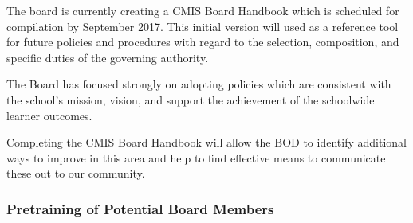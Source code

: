 \begin{findings}
The board is currently creating a CMIS Board Handbook which is scheduled for compilation by September 2017. This initial version will used as a reference tool for future policies and procedures with regard to the selection, composition, and specific duties of the governing authority. 


The Board has focused strongly on adopting policies which are consistent with the school’s mission, vision, and support the achievement of the schoolwide learner outcomes.

Completing the CMIS Board Handbook will allow the BOD to identify additional ways to improve in this area and help to find effective means to communicate these out to our community.
\end{findings}

\subsubsection{Pretraining of Potential Board Members}



